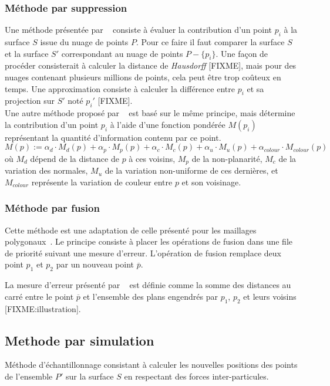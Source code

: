 \subsubsection{Méthode par suppression}
Une méthode présentée par \citeauthor{Alexa2001}~\cite{Alexa2001} consiste à évaluer la contribution d'un point $p_i$ à la surface $S$ issue du nuage de points $P$. Pour ce faire il faut comparer la surface $S$ et la surface $S'$ correspondant au nuage de points $P-\{p_i\}$. Une façon de procéder consisterait à calculer la distance de \emph{Hausdorff} [FIXME], mais pour des nuages contenant plusieurs millions de points, cela peut être trop coûteux en temps. Une approximation consiste à calculer la différence entre $p_i$ et sa projection sur $S'$ noté $p_i'$ [FIXME].\\

Une autre méthode proposé par \citeauthor{Linsen2001}~\cite{Linsen2001} est basé sur le même principe, mais détermine la contribution d'un point $p_i$ à l'aide d'une fonction pondérée $M(p_i)$ représentant la quantité d'information contenu par ce point.
$$M(p) := \alpha_d \cdot M_d(p)+\alpha_p \cdot M_p(p)+\alpha_c \cdot M_c(p)+\alpha_u \cdot M_u(p)+\alpha_{colour} \cdot M_{colour}(p)$$
où $M_d$ dépend de la distance de $p$ à ces voisins, $M_p$ de la non-planarité, $M_c$ de la variation des normales, $M_u$ de la variation non-uniforme de ces dernières, et $M_{colour}$ représente la variation de couleur entre $p$ et son voisinage.

\subsubsection{Méthode par fusion}
Cette méthode est une adaptation de celle présenté pour les maillages polygonaux~\cite{Hoppe1996}. Le principe consiste à placer les opérations de fusion dans une file de priorité suivant une mesure d'erreur. L'opération de fusion remplace deux point $p_1$ et $p_2$ par un nouveau point $\overline{p}$.

La mesure d'erreur présenté par \citeauthor{Pauly2002}~\cite{Pauly2002} est définie comme la somme des distances au carré entre le point $\overline{p}$ et l'ensemble des plans engendrés par $p_1$, $p_2$ et leurs voisins [FIXME:illustration].

\subsection{Methode par simulation}
\begin{definition}
  Méthode d'échantillonnage consistant à calculer les nouvelles positions des points de l'ensemble $P'$ sur la surface $S$ en respectant des forces inter-particules.
\end{definition}

